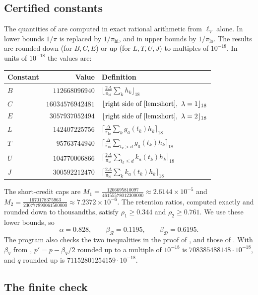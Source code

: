 \documentclass[11pt,colorlinks]{charlie}
\newcommand{\cR}{\mathcal{R}}
\newcommand{\cD}{\mathcal{D}}
\newcommand{\pilo}{\pi_{\mathrm{lo}}}
\newcommand{\pihi}{\pi_{\mathrm{hi}}}
\newcommand{\up}[1]{\lceil #1\rceil_{18}}
\newcommand{\dn}[1]{\lfloor #1\rfloor_{18}}
\begin{document}
\subsection{Certified constants}
The quantities of  are computed in exact rational arithmetic from $\ell_V$ alone. In lower bounds $1/\pi$ is replaced by $1/\pihi$, and in upper bounds by $1/\pilo$. The results are rounded down (for $B,C,E$) or up (for $L,T,U,J$) to multiples of $10^{-18}$. In units of $10^{-18}$ the values are:
\begin{center}\small
\begin{tabular}{@{}lrl@{}}
\toprule
Constant & Value & Definition\\
\midrule
$B$ & $112668096940$ & $\dn{\frac{2\Delta}{\pihi}\sum_kh_k}$ \\
$C$ & $16034576942481$ & $\dn{\text{right side of \Cref{lem:short}},\ \lambda=1}$ \\
$E$ & $3057937052494$ & $\dn{\text{right side of \Cref{lem:short}},\ \lambda=2}$ \\
$L$ & $142407225756$ & $\up{\frac{\Delta}{\pilo}\sum_kg_a(t_k)h_k}$ \\
$T$ & $95763744940$ & $\up{\frac{\Delta}{\pilo}\sum_{t_k>d}g_a(t_k)h_k}$ \\
$U$ & $104770006866$ & $\up{\frac{2\Delta}{\pilo}\sum_{t_k\le d}k_a(t_k)h_k}$ \\
$J$ & $300592212470$ & $\up{\frac{2\Delta}{\pilo}\sum_kk_a(t_k)h_k}$ \\
\bottomrule
\end{tabular}
\end{center}
The short-credit caps are $M_1=\frac{1206695810097}{46155578012300000}\approx2.6144\times10^{-5}$ and $M_2=\frac{1670178375963}{230777890061500000}\approx7.2372\times10^{-6}$. The retention ratios, computed exactly and rounded down to thousandths, satisfy $\rho_1\ge0.344$ and $\rho_2\ge0.761$. We use these lower bounds, so
\[
 \alpha=0.828,\qquad\beta_\cR=0.1195,\qquad\beta_\cD=0.6195 .
\]
The program also checks the two inequalities in the proof of , and those of . With $\beta_V$ from , $p'=p-\beta_V/2$ rounded up to a multiple of $10^{-18}$ is $708385488148\cdot10^{-18}$, and $q$ rounded up is $71152801254159\cdot10^{-18}$.

\subsection{The finite check}
\end{document}
